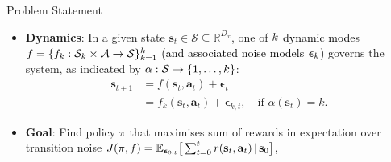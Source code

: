 \documentclass[final,12pt]{beamer}
\newlength{\colwidth}
\newcommand{\E}{\mathbb{E}}    %
\newcommand{\R}{\mathbb{R}}    %
\renewcommand{\mid}{\,|\,}
\DeclareMathOperator{\R}{\mathbb{R}}
\DeclareMathOperator{\E}{\mathbb{E}}
\newcommand{\modeInd}{\ensuremath{k}}
\newcommand{\StateDim}{\ensuremath{{D_x}}}
\newcommand{\ControlDim}{\ensuremath{{D_u}}}
\newcommand{\ModeInd}{\ensuremath{\MakeUppercase{\modeInd}}}
\newcommand{\mode}[1]{\ensuremath{#1_{\modeInd}}}
\newcommand{\state}{\ensuremath{\mathbf{x}}}
\newcommand{\control}{\ensuremath{\mathbf{u}}}
\newcommand{\modeVar}{\ensuremath{\alpha}}
\newcommand{\timeInd}{\ensuremath{t}}
\newcommand{\TimeInd}{\ensuremath{\MakeUppercase{\timeInd}}}
\newcommand{\dynamicsFunc}{\ensuremath{f}}
\newcommand{\desiredMode}{\ensuremath{\modeInd^{*}}}
\newcommand{\stateDomain}{\ensuremath{\mathcal{S}}}
\newcommand{\controlDomain}{\ensuremath{\mathcal{A}}}
\renewcommand{\state}{\ensuremath{\mathbf{s}}}
\renewcommand{\mode}[1]{\ensuremath{#1_{\modeInd}}}
\renewcommand{\control}{\ensuremath{\mathbf{a}}}
\newcommand{\rewardFunc}{\ensuremath{r}}
\begin{document}
\begin{frame}[t]
\begin{columns}[t]
\begin{column}{\colwidth}
\begin{block}{Problem Statement}
    \begin{itemize}
        \item \textbf{Dynamics}: In a given state $\state_t \in \stateDomain \subseteq \R^{\StateDim}$, one of $\color{black}{\ModeInd}$ \textcolor{black}{dynamic modes}
      $\dynamicsFunc = \{\mode{\dynamicsFunc} : \mode{\stateDomain} \times \controlDomain \rightarrow \stateDomain \}_{\modeInd=1}^{\ModeInd}$ \textcolor{black}{(and associated noise models} $\color{black}{\bm\epsilon_{\modeInd}}$) governs the system, as
            indicated by $\color{black}{\alpha: \stateDomain \rightarrow \{1,\ldots, \ModeInd\}}$:
          \begin{align} \label{eq-dynamics}
          \state_{\timeInd+1} &= \dynamicsFunc(\state_\timeInd, \control_\timeInd) + \bm\epsilon_{\timeInd} \\
          &= \mode{\dynamicsFunc}(\state_\timeInd, \control_\timeInd) + \bm\epsilon_{\modeInd, \timeInd},
          \quad\text{if } \modeVar(\state_{\timeInd}) = \modeInd.
          \end{align}
      \item \textbf{Goal}:
      Find policy $\pi$ that maximises sum of rewards in expectation over transition noise
      $J(\pi, \dynamicsFunc) = \E_{\bm\epsilon_{0:\TimeInd}} \big[ \sum_{\timeInd=0}^{\TimeInd} \rewardFunc(\state_{\timeInd}, \control_{\timeInd}) \mid \state_0 \big]$,

\end{itemize}
\end{block}
\end{column}
\end{columns}
\end{frame}
\end{document}
